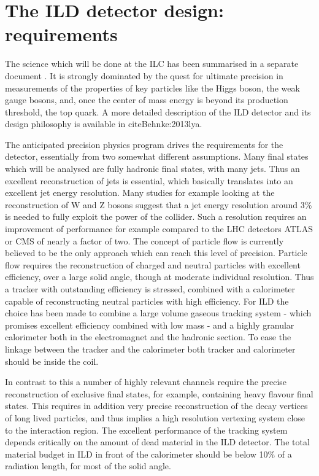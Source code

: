 \documentclass[%
 amsmath,amssymb,
 aps,
]{revtex4-1}
\begin{document}
\section{The ILD detector design: requirements}
The science which will be done at the ILC has been summarised in a separate document \cite{ILC-ESU1}. It is strongly dominated by the quest for ultimate precision in measurements of the properties of key particles like the Higgs boson, the weak gauge bosons, and, once the center of mass energy is beyond its production threshold, the top quark. A more detailed description of the ILD detector and its design philosophy is available in cite{Behnke:2013lya}.

The anticipated precision physics program drives the requirements for the detector, essentially from two somewhat different assumptions. Many final states which will be analysed are fully hadronic final states, with many jets. Thus an excellent reconstruction of jets is essential, which basically translates into an excellent jet energy resolution. Many studies for example looking at the reconstruction of W and Z bosons suggest that a jet energy resolution around 3\% is needed to fully exploit the power of the collider. Such a resolution requires an improvement of performance for example compared to the LHC detectors ATLAS or CMS of nearly a factor of two. The concept of particle flow is currently believed to be the only approach which can reach this level of precision. Particle flow requires the reconstruction of charged and neutral particles with excellent efficiency, over a large solid angle, though at moderate individual resolution. Thus a tracker with outstanding efficiency is stressed, combined with a calorimeter capable of reconstructing neutral particles with high efficiency. For ILD the choice has been made to combine a large volume gaseous tracking system - which promises excellent efficiency combined with low mass - and a highly granular calorimeter both in the electromagnet and the hadronic section. To ease the linkage between the tracker and the calorimeter both tracker and calorimeter should be inside the coil. 

In contrast to this a number of highly relevant channels require the precise reconstruction of exclusive final states, for example, containing heavy flavour final states. This requires in addition very precise reconstruction of the decay vertices of long lived particles, and thus implies a high resolution vertexing system close to the interaction region. 
The excellent performance of the tracking system  depends critically on the amount of dead material in the ILD detector. The total material budget in ILD in front of the calorimeter should be below 10\% of a radiation length, for most of the solid angle.
\end{document}
